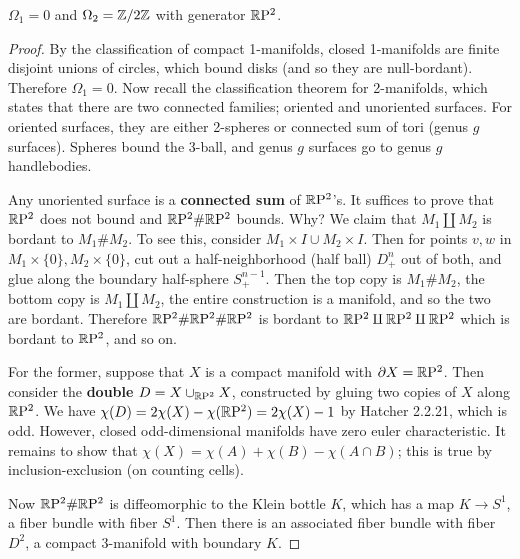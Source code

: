 \begin{prop}
    $\Omega_1=0$ and $\Omega_2=\mathbb{Z} /2\mathbb{Z}$ with generator $\mathbb{R} \mathrm P^2$.
\end{prop}
\begin{proof}
    By the classification of compact 1-manifolds, closed 1-manifolds are finite disjoint unions of circles,  which bound disks (and so they are null-bordant). Therefore $\Omega_1=0$. Now recall the classification theorem for 2-manifolds, which states that there are two connected families; oriented and unoriented surfaces. For oriented surfaces, they are either 2-spheres or connected sum of tori (genus $g$ surfaces). Spheres bound the 3-ball, and genus $g$ surfaces go to genus $g$ handlebodies. 

    Any unoriented surface is a \textbf{connected sum} of $\mathbb{R} \mathrm P^2$'s. It suffices to prove that $\mathbb{R} \mathrm P^2$ does not bound and $\mathbb{R} \mathrm P^2\# \mathbb{R} \mathrm P^2$ bounds. Why? We claim that $M_1 \amalg M_2 $ is bordant to $M_1 \# M_2$. To see this, consider $M_1 \times I \cup M_2 \times I$. Then for points $v,w$ in $M_1 \times \{0\} , M_2 \times \{0\} $, cut out a half-neighborhood (half ball) $D^n _{+}$ out of both, and glue along the boundary half-sphere $S^{n-1}_{+}$. Then the top copy is $M_1 \# M_2$, the bottom copy is $M_1 \amalg M_2$, the entire construction is a manifold, and so the two are bordant. Therefore $\mathbb{R} \mathrm P^2 \# \mathbb{R} \mathrm P^2 \# \mathbb{R} \mathrm P^2$ is bordant to $\mathbb{R} \mathrm P^2 \amalg \mathbb{R} \mathrm P^2 \amalg \mathbb{R} \mathrm P^2$ which is bordant to $\mathbb{R} \mathrm P^2$, and so on.

    For the former, suppose that $X$ is a compact manifold with $\partial X=\mathbb{R} \mathrm P^2$. Then consider the \textbf{double} $D= X \cup _{\mathbb{R} \mathrm P^2}X$, constructed by gluing two copies of $X$ along $\mathbb{R} \mathrm P^2$. We have $\chi(D)=2\chi(X)-\chi(\mathbb{R} \mathrm P^2)=2\chi(X)-1$ by Hatcher 2.2.21, which is odd. However, closed odd-dimensional manifolds have zero euler characteristic. It remains to show that $\chi(X)=\chi(A)+\chi(B)-\chi(A\cap B)$; this is true by inclusion-exclusion (on counting cells). 


    Now $\mathbb{R} \mathrm P^2\# \mathbb{R} \mathrm P^2$ is diffeomorphic to the Klein bottle $K$, which has a map  $K \to S^1 $, a fiber bundle with fiber $S^1 $. Then there is an associated fiber bundle with fiber $D^2$, a compact 3-manifold with boundary $K$.
\end{proof}

